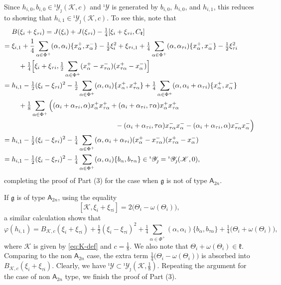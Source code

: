 \documentclass[11pt,reqno]{amsart}
\numberwithin{equation}{section}
\theoremstyle{definition}
\theoremstyle{remark}
\newcommand{\g}{\mathfrak{g}}
\newcommand{\Yi}{{^\imath\mathscr{Y}}}
\newcommand{\YiJ}{{^\imath\mathscr{Y}_{\jmath}}}
\begin{document}
Since $h_{i,0},b_{i,0}\in \YiJ(\mathscr K,c)$ and $\Yi$ is generated by $b_{i,0}$, $h_{i,0}$, and $h_{i,1}$, this reduces to showing that $h_{i,1}\in \YiJ(\mathscr K,c)$. To see this, note that
\begin{align*}
&B(\xi_i+\xi_{\tau i})=J(\xi_i)+J(\xi_{\tau i})
-\tfrac14[\xi_i+\xi_{\tau i},C_{\mathfrak k}]
\\
={}&
\xi_{i,1}
+\frac14\sum_{\alpha\in\Phi^+}
(\alpha,\alpha_i)\{x_\alpha^+,x_\alpha^-\}
-\tfrac12\xi_i^2
+\xi_{\tau i,1}
+\tfrac14\sum_{\alpha\in\Phi^+}
(\alpha,\alpha_{\tau i})\{x_\alpha^+,x_\alpha^-\}
-\tfrac12\xi_{\tau i}^2
\\
&\quad
+\tfrac14
\Big[
 \xi_i+\xi_{\tau i},
 \tfrac12\sum_{\alpha\in\Phi^+}
 (x_\alpha^+-x_{\tau\alpha}^-)
 (x_{\tau\alpha}^+-x_\alpha^-)
\Big]
\\
={}&
h_{i,1}
-\tfrac12(\xi_i-\xi_{\tau i})^2
-\tfrac12\sum_{\alpha\in\Phi^+}
(\alpha,\alpha_i)
\{x_\alpha^+,x_{\tau\alpha}^+\}
+\tfrac14\sum_{\alpha\in\Phi^+}
(\alpha,\alpha_i+\alpha_{\tau i})
\{x_\alpha^+,x_\alpha^-\}
\\
&\quad
+\tfrac18\sum_{\alpha\in\Phi^+}
\Big(
 (\alpha_i+\alpha_{\tau i},\alpha)
 x_\alpha^+x_{\tau\alpha}^+
 +(\alpha_i+\alpha_{\tau i},\tau\alpha)
 x_\alpha^+x_{\tau\alpha}^+
\\
&\hspace{5.3cm}
 -(\alpha_i+\alpha_{\tau i},\tau\alpha)
 x_{\tau\alpha}^-x_\alpha^-
 -(\alpha_i+\alpha_{\tau i},\alpha)
 x_{\tau\alpha}^-x_\alpha^-
\Big)
\\
={}&
h_{i,1}
-\tfrac12(\xi_i-\xi_{\tau i})^2
-\tfrac14\sum_{\alpha\in\Phi^+}
(\alpha,\alpha_i+\alpha_{\tau i})
(x_\alpha^+-x_{\tau\alpha}^-)
(x_{\tau\alpha}^+-x_\alpha^-)
\\
={}&
h_{i,1}
-\tfrac12(\xi_i-\xi_{\tau i})^2
-\tfrac14\sum_{\alpha\in\Phi^+}
(\alpha,\alpha_i)\{b_{\alpha},b_{\tau \alpha}\}\in \YiJ=\YiJ(\mathscr K,0),
\end{align*}
completing the proof of Part (3) for the case when $\g$ is not of type $\mathsf A_{2n}$.

If $\g$ is of type $\mathsf A_{2n}$, using the equality
\[
[\mathscr K,\xi_i+\xi_{\tau i}]=2\bigl(\Theta_i-\omega(\Theta_i)\bigr),
\]
a similar calculation shows that
\[
\varphi(h_{i,1})
=
B_{\mathscr K,c}(\xi_i+\xi_{\tau i})
+\tfrac12(\xi_i-\xi_{\tau i})^2
+\tfrac14\sum_{\alpha\in\Phi^+}
(\alpha,\alpha_i)\{b_\alpha,b_{\tau\alpha}\}
+\tfrac14\bigl(\Theta_i+\omega(\Theta_i)\bigr),
\]
where $\mathscr K$ is given by \eqref{eq:K-def} and $c=\tfrac18$. We also note that $\Theta_i+\omega(\Theta_i)\in\mathfrak k$. Comparing to the non $\mathsf A_{2n}$ case, the extra term $\tfrac14\bigl(\Theta_i-\omega(\Theta_i)\bigr)$ is absorbed into $B_{\mathscr K,c}(\xi_i+\xi_{\tau i})$. Clearly, we have $\Yi\subset \YiJ(\mathscr K,\tfrac18)$. Repeating the argument for the case of non $\mathsf A_{2n}$ type, we finish the proof of Part (3).
\end{document}

